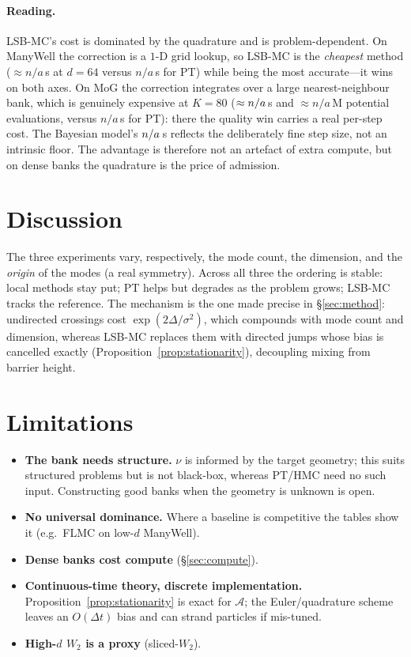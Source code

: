 \documentclass[11pt]{article}
\theoremstyle{plain}
\theoremstyle{remark}
\newcommand{\inputtab}[1]{\IfFileExists{tables/#1.tex}{}{}}
\providecommand{\MogPTruntimeBig}{n/a}\providecommand{\MogLSBpotBig}{n/a}
\providecommand{\MwLSBruntimeBig}{n/a}\providecommand{\MwPTruntimeBig}{n/a}
\begin{document}
\inputtab{compute_table}

\paragraph{Reading.} LSB-MC's cost is dominated by the quadrature and is
problem-dependent. On ManyWell the correction is a $1$-D grid lookup, so LSB-MC is
the \emph{cheapest} method ($\approx\MwLSBruntimeBig$\,s at $d{=}64$ versus
$\MwPTruntimeBig$\,s for PT) while being the most accurate---it wins on both axes.
On MoG the correction integrates over a large nearest-neighbour bank, which is
genuinely expensive at $K{=}80$ ($\approx n/a$\,s and
$\approx\MogLSBpotBig$\,M potential evaluations, versus $\MogPTruntimeBig$\,s for
PT): there the quality win carries a real per-step cost. The Bayesian model's
$n/a$\,s reflects the deliberately fine step size, not an intrinsic floor.
The advantage is therefore not an artefact of extra compute, but on dense banks the
quadrature is the price of admission.

\section{Discussion}\label{sec:discussion}
The three experiments vary, respectively, the mode count, the dimension, and the
\emph{origin} of the modes (a real symmetry). Across all three the ordering is
stable: local methods stay put; PT helps but degrades as the problem grows; LSB-MC
tracks the reference. The mechanism is the one made precise in \S\ref{sec:method}:
undirected crossings cost $\exp(2\Delta/\sigma^2)$, which compounds with mode count
and dimension, whereas LSB-MC replaces them with directed jumps whose bias is
cancelled exactly (Proposition~\ref{prop:stationarity}), decoupling mixing from
barrier height.

\section{Limitations}\label{sec:limitations}
\begin{itemize}
\item \textbf{The bank needs structure.} $\nu$ is informed by the target geometry;
this suits structured problems but is not black-box, whereas PT/HMC need no such
input. Constructing good banks when the geometry is unknown is open.
\item \textbf{No universal dominance.} Where a baseline is competitive the tables
show it (e.g.\ FLMC on low-$d$ ManyWell).
\item \textbf{Dense banks cost compute} (\S\ref{sec:compute}).
\item \textbf{Continuous-time theory, discrete implementation.}
Proposition~\ref{prop:stationarity} is exact for $\mathcal A$; the Euler/quadrature
scheme leaves an $O(\Delta t)$ bias and can strand particles if mis-tuned.
\item \textbf{High-$d$ $W_2$ is a proxy} (sliced-$W_2$).
\end{itemize}
\end{document}
